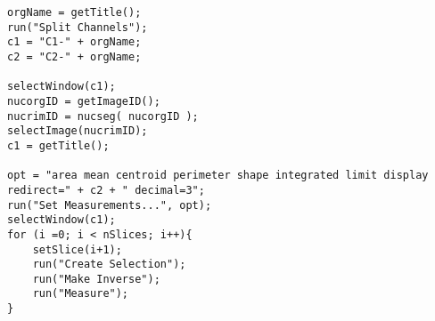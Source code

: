 \begin{lstlisting}
orgName = getTitle();
run("Split Channels");
c1 = "C1-" + orgName;
c2 = "C2-" + orgName;

selectWindow(c1);
nucorgID = getImageID();
nucrimID = nucseg( nucorgID );
selectImage(nucrimID);
c1 = getTitle();

opt = "area mean centroid perimeter shape integrated limit display redirect=" + c2 + " decimal=3";
run("Set Measurements...", opt);
selectWindow(c1);
for (i =0; i < nSlices; i++){
	setSlice(i+1);
	run("Create Selection");
	run("Make Inverse");
	run("Measure");
}

\end{lstlisting}